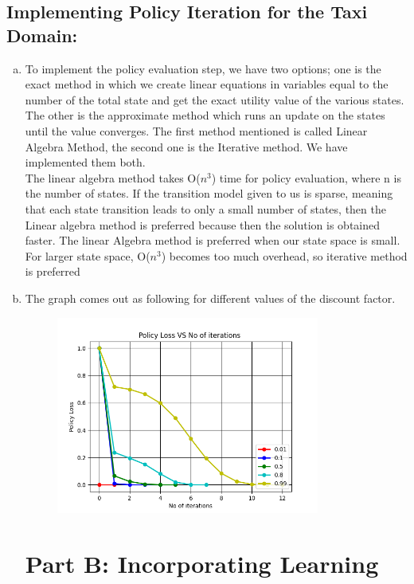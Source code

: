 \documentclass{article}
\begin{document}
\subsection{Implementing Policy Iteration for the Taxi Domain:}
\begin{enumerate}[a)]
    \item To implement the policy evaluation step, we have two options; one is the exact method in which we create linear equations in variables equal to the number of the total state and get the exact utility value of the various states. The other is the approximate method which runs an update on the states until the value converges.
The first method mentioned is called Linear Algebra Method, the second one is the Iterative method. We have implemented them both. \\
The linear algebra method takes O($n^3$) time for policy evaluation, where n is the number of states. If the transition model given to us is sparse, meaning that each state transition leads to only a small number of states, then the Linear algebra method is preferred because then the solution is obtained faster. The linear Algebra method is preferred when our state space is small. For larger state space, O($n^3$) becomes too much overhead, so iterative method is preferred
    \item The graph comes out as following for different values of the discount factor.
    \begin{center}
        \begin{figure}[h]
\hfill\includegraphics[height=6.5cm]{QA3b.png}\hspace*{\fill}
\end{figure}
\end{center}

\pagebreak

\section{Part B: Incorporating Learning}



\end{enumerate}
\end{document}
